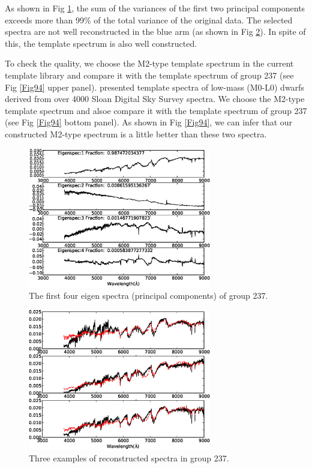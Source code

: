 \documentclass[referee]{raa}            %
\begin{document}
As shown in Fig \ref{Fig74}, the sum of the variances of the first two principal components  exceeds more than 99\% of the total variance of the original data.
The selected spectra are not well reconstructed in the blue arm (as shown in Fig \ref{Fig84}).
In spite of this, the template spectrum is also well constructed.


To check the quality, we choose the M2-type template spectrum in the current template library \citep{wang2010calibration} and compare it with the template spectrum of group 237 (see Fig \ref{Fig94} upper panel).
\citet{bochanski2007low}  presented template spectra of low-mass  (M0-L0) dwarfs derived from over 4000 Sloan Digital Sky Survey spectra.
We choose the M2-type template spectrum and alsoe compare it with the template spectrum of group 237 (see Fig \ref{Fig94} bottom panel).
As shown in Fig \ref{Fig94}, we can infer that our constructed M2-type spectrum is a little better than these two spectra.


 \begin{figure}
   \centering
   \includegraphics[width=8cm, angle=0,clip]{f74.eps}
   \caption{The first four eigen spectra (principal components) of group 237.
   }
   \label{Fig74}
\end{figure}

 \begin{figure}
   \centering
   \includegraphics[width=8cm, angle=0,clip]{f84.eps}
   \caption{Three examples of reconstructed spectra in group 237.
   }
   \label{Fig84}
\end{figure}
\end{document}
